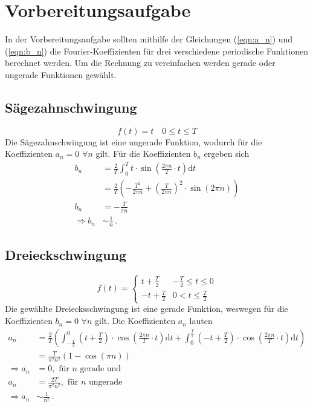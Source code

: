 \section{Vorbereitungsaufgabe}
\label{sec:Vorbereitungsaufgabe}
In der Vorbereitungsaufgabe sollten mithilfe der Gleichungen (\ref{eqn:a_n}) und (\ref{eqn:b_n}) die Fourier-Koeffizienten 
für drei verschiedene periodische Funktionen berechnet werden. Um die Rechnung zu vereinfachen werden gerade oder ungerade Funktionen gewählt.
\subsection{Sägezahnschwingung}
\begin{equation*}
    f(t) = t\quad 0 \leq t \leq T
\end{equation*}
Die Sägezahnschwingung ist eine ungerade Funktion, wodurch für die Koeffizienten $a_n = 0 \,\,\forall n $ gilt. 
Für die Koeffizienten $b_n$ ergeben sich
\begin{align*}
    b_n &= \frac{2}{T} \int_{0}^{T} t \cdot \sin \left(\frac{2 \pi n}{T}\cdot t\right) \text{d}t\\
    &= \frac{2}{T} \left(-\frac{T^2}{2 \pi n} + \left(\frac{T}{2 \pi n}\right)^2 \cdot\sin \left(2 \pi n\right)\right)\\
    b_n&= - \frac{T}{\pi n}\\
    \Rightarrow b_n &\sim \frac{1}{n}\,.
\end{align*}
\subsection{Dreieckschwingung}
\begin{equation*}
    f(t) = \begin{cases}
        t+ \frac{T}{2} & -\frac{T}{2} \leq t \leq 0\\
        -t + \frac{T}{2} & 0 < t \leq \frac{T}{2}
    \end{cases}
\end{equation*}
Die gewählte Dreiecksschwingung ist eine gerade Funktion, weswegen für die Koeffizienten $b_n = 0 \,\, \forall n$ gilt.
Die Koeffizienten $a_n$ lauten 
\begin{align*}
    a_n &= \frac{2}{T}\left(\int_{-\frac{T}{2}}^{0} (t+\frac{T}{2})\cdot \cos \left( \frac{2 \pi n}{T}\cdot t\right)\text{d}t + \int_{0}^{\frac{T}{2}}(-t+\frac{T}{2})\cdot \cos\left(\frac{2 \pi n}{T}\cdot t\right)\text{d}t\right)\\
    &= \frac{T}{{\pi}^2 n^2}\left(1-\cos\left(\pi n\right)\right)\\
    \Rightarrow a_n &= 0,\text{ für } n\text{ gerade und}\\
     a_n &= \frac{2T}{{\pi^2} n^2},\text{ für } n\text{ ungerade}\\
    \Rightarrow a_n &\sim \frac{1}{n^2}\,.
\end{align*}
